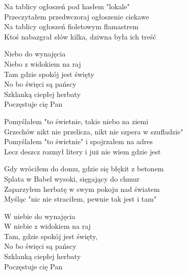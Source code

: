 \begin{text}
    Na tablicy ogłoszeń pod hasłem "lokale"\\
    Przeczytałem przedwczoraj ogłoszenie ciekawe\\
    Na tablicy ogłoszeń fioletowym flamastrem\\
    Ktoś nabazgrał słów kilka, dziwna była ich treść

    \vin Niebo do wynajęcia\\
    \vin Niebo z widokiem na raj\\
    \vin Tam gdzie spokój jest święty\\
    \vin No bo święci są pańscy\\
    \vin Szklanką ciepłej herbaty\\
    \vin Poczęstuje cię Pan

    Pomyślałem "to świetnie, takie niebo na ziemi\\
    Grzechów nikt nie przelicza, nikt nie szpera w szufladzie"\\
    Pomyślałem "to świetnie" i spojrzałem na adres\\
    Lecz deszcz rozmył litery i już nie wiem gdzie jest

    Gdy wróciłem do domu, gdzie się błękit z betonem\\
    Splata w Babel wysoki, sięgający do chmur\\
    Zaparzyłem herbatę w swym pokoju nad światem\\
    Myśląc "nic nie straciłem, pewnie tak jest i tam"

    W niebie do wynajęcia\\
    W niebie z widokiem na raj\\
    Tam, gdzie spokój jest święty,\\
    No bo święci są pańscy\\
    Szklanką ciepłej herbaty\\
    Poczęstuje cię Pan
\end{text}
\begin{chord}

\end{chord}